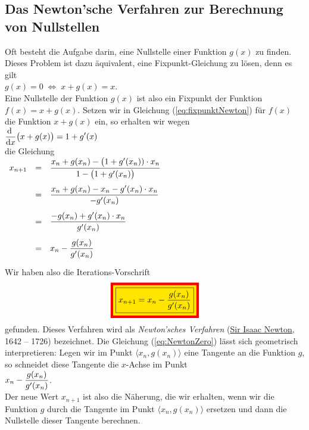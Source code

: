 \subsection{Das Newton'sche Verfahren zur Berechnung von Nullstellen}
Oft besteht die Aufgabe darin, eine Nullstelle einer Funktion $g(x)$ zu finden.
Dieses Problem ist dazu \"aquivalent, eine Fixpunkt-Gleichung zu l\"osen, denn es gilt
\\[0.2cm]
\hspace*{1.3cm}
$g(x) = 0 \;\Leftrightarrow\; x + g(x) = x$.
\\[0.2cm]
Eine Nullstelle der Funktion $g(x)$ ist also ein Fixpunkt der Funktion $f(x) = x + g(x)$.
Setzen wir in Gleichung (\ref{eq:fixpunktNewton}) f\"ur $f(x)$ die Funktion $x + g(x)$ ein,
so erhalten wir wegen
\\[0.2cm]
\hspace*{1.3cm}
$\displaystyle\frac{\textrm{d}\;}{\textrm{d}x} \bigl(x+g(x)\bigr) = 1 + g'(x)$
\\[0.2cm]
die Gleichung 
\\[0.2cm]
\hspace*{1.3cm}
$\begin{array}[t]{lcl}
 x_{n+1} & = & \displaystyle\frac{x_n + g(x_n) - \bigl(1 + g'(x_n)) \cdot  x_{n}}{1 - \bigl(1 + g'(x_n)\bigr)} \\[0.5cm]
        & = & \displaystyle\frac{x_n + g(x_n)  - x_{n} - g'(x_n)\cdot x_n}{-g'(x_n)} \\[0.5cm]
        & = & \displaystyle\frac{- g(x_n) + g'(x_n)\cdot x_n}{g'(x_n)} \\[0.5cm]
        & = & \displaystyle x_n - \frac{g(x_n)}{g'(x_n)} \\[0.5cm]
 \end{array}
$
\\[0.2cm]
Wir haben also  die Iterations-Vorschrift 
\begin{equation}
  \label{eq:NewtonZero}
  \colorbox{red}{\colorbox{orange}{\framebox{$\ds x_{n+1} = x_n - \frac{g(x_n)}{g'(x_n)}$}}}
\end{equation}
gefunden.  Dieses Verfahren wird als  \emph{Newton'sches Verfahren} 
(\href{https://en.wikipedia.org/wiki/Isaac_Newton}{Sir Isaac Newton}, 1642 -- 1726)
bezeichnet.
Die Gleichung  (\ref{eq:NewtonZero}) l\"asst sich geometrisch interpretieren: Legen wir im Punkt
$\langle x_n, g(x_n) \rangle$ eine Tangente an die Funktion $g$, so schneidet diese Tangente die
$x$-Achse im Punkt 
\\[0.2cm]
\hspace*{1.3cm}
$\displaystyle x_n - \frac{g(x_n)}{g'(x_n)}$.
\\[0.2cm]
Der neue Wert $x_{n+1}$ ist also die N\"aherung, die wir erhalten, wenn wir die Funktion $g$ durch die
Tangente im Punkt $\langle x_n, g(x_n) \rangle$ ersetzen und dann die Nullstelle  dieser
Tangente berechnen.


